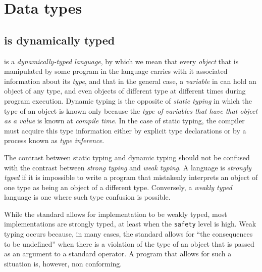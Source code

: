 \chapter{Data types}
\label{chap-data-types}

\section{\commonlisp{} is dynamically typed}

\commonlisp{} is a \emph{dynamically-typed language}, by which we mean
that every \emph{object} that is manipulated by some program in the
language carries with it associated information about its \emph{type},
and that in the general case, a \emph{variable} in \commonlisp{} can
hold an object of any type, and even objects of different type at
different times during program execution.  Dynamic typing is the
opposite of \emph{static typing} in which the type of an object is
known only because the \emph{type of variables that have that object
  as a value} is known at \emph{compile time}.  In the case of static
typing, the compiler must acquire this type information either by
explicit type declarations or by a process known as \emph{type
  inference}.

The contrast between static typing and dynamic typing should not be
confused with the contrast between \emph{strong typing} and \emph{weak
  typing}.  A language is \emph{strongly typed} if it is impossible to
write a program that mistakenly interprets an object of one type as
being an object of a different type.  Conversely, a \emph{weakly
  typed} language is one where such type confusion is possible.

While the \commonlisp{} standard allows for implementation to be
weakly typed, most implementations are strongly typed, at least when
the \texttt{safety} level is high.  Weak typing occurs because, in
many cases, the standard allows for ``the consequences to be
undefined'' when there is a violation of the type of an object that is
passed as an argument to a standard operator.  A program that allows
for such a situation is, however, non conforming.
